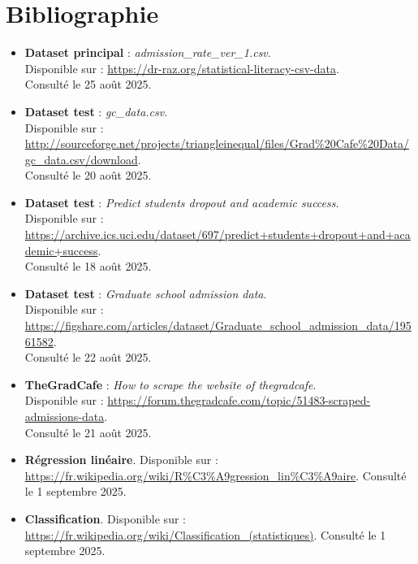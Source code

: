 \chapter*{Bibliographie}

\begin{itemize}
	\item \textbf{Dataset principal} : \textit{admission\_rate\_ver\_1.csv}. \\
	Disponible sur : \url{https://dr-raz.org/statistical-literacy-csv-data}. \\
	Consulté le 25 août 2025.
	
	\item \textbf{Dataset test} : \textit{gc\_data.csv}. \\
	Disponible sur : \url{http://sourceforge.net/projects/triangleinequal/files/Grad%20Cafe%20Data/gc_data.csv/download}. \\
	Consulté le 20 août 2025.
	
	\item \textbf{Dataset test} : \textit{Predict students dropout and academic success}. \\
	Disponible sur : \url{https://archive.ics.uci.edu/dataset/697/predict+students+dropout+and+academic+success}. \\
	Consulté le 18 août 2025.
	
	\item \textbf{Dataset test} : \textit{Graduate school admission data}. \\
	Disponible sur : \url{https://figshare.com/articles/dataset/Graduate_school_admission_data/19561582}. \\
	Consulté le 22 août 2025.
	
	\item \textbf{TheGradCafe} : \textit{How to scrape the website of thegradcafe}. \\
	Disponible sur : \url{https://forum.thegradcafe.com/topic/51483-scraped-admissions-data}. \\
	Consulté le 21 août 2025.
	
	\item \textbf{Régression linéaire}. Disponible sur : \url{https://fr.wikipedia.org/wiki/R%C3%A9gression_lin%C3%A9aire}. Consulté le 1 septembre 2025.
	
	\item \textbf{Classification}. Disponible sur : \url{https://fr.wikipedia.org/wiki/Classification_(statistiques)}. Consulté le 1 septembre 2025.
	

\end{itemize}

